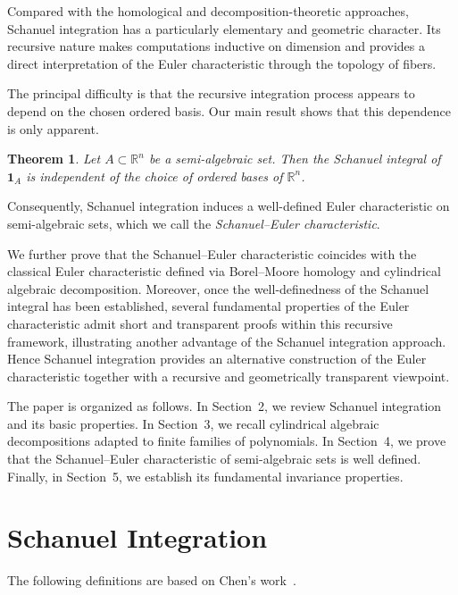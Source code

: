 \documentclass[11pt]{article}
\newtheorem{theorem}{Theorem}[section]
\theoremstyle{remark}
\newcommand{\R}{\mathbb R}
\newcommand{\1}{\mathbf 1}
\begin{document}
Compared with the homological and decomposition-theoretic approaches, Schanuel integration has a particularly elementary and geometric character. 
Its recursive nature makes computations inductive on dimension and provides a direct interpretation of the Euler characteristic through the topology of fibers.

The principal difficulty is that the recursive integration process appears to depend on the chosen ordered basis. Our main result shows that this dependence is only apparent.

\begin{theorem}
Let $A\subset\R^n$ be a semi-algebraic set. Then the Schanuel integral of $\mathbf 1_A$ is independent of the choice of ordered bases of $\R^n$.
\end{theorem}

Consequently, Schanuel integration induces a well-defined Euler characteristic on semi-algebraic sets, which we call the \emph{Schanuel--Euler characteristic}.

We further prove that the Schanuel--Euler characteristic coincides with the classical Euler characteristic defined via Borel--Moore homology and cylindrical algebraic decomposition.
Moreover, once the well-definedness of the Schanuel integral has been established, several fundamental properties of the Euler characteristic admit short and transparent proofs within this recursive framework, illustrating another advantage of the Schanuel integration approach.
Hence Schanuel integration provides an alternative construction of the Euler characteristic together with a recursive and geometrically transparent viewpoint.

The paper is organized as follows.
In Section~2, we review Schanuel integration and its basic properties.
In Section~3, we recall cylindrical algebraic decompositions adapted to finite
families of polynomials.
In Section~4, we prove that the Schanuel--Euler characteristic of
semi-algebraic sets is well defined.
Finally, in Section~5, we establish its fundamental invariance properties.


\section{Schanuel Integration}

The following definitions are based on Chen's work~\cite{chen1993euler}.
\end{document}
